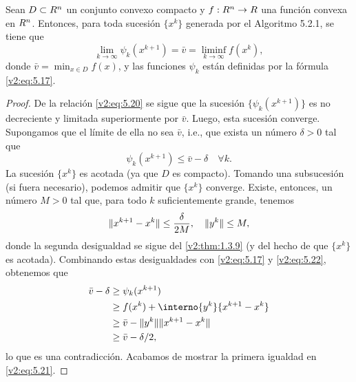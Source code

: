 \begin{theorem}\label{v2:thm:5.2.1}
    Sean $D \subset R^n$ un conjunto convexo compacto y $f : R^n \to R$ una función convexa en $R^n$. 
    Entonces, para toda sucesión $\{x^k\}$ generada por el Algoritmo 5.2.1, se tiene que
    \begin{equation}
        \lim_{k \to \infty} \psi_k(x^{k+1}) = \bar{v} = \liminf_{k \to \infty} f(x^k),
        \label{v2:eq:5.21}
    \end{equation}
    donde $\bar{v} = \min_{x \in D} f(x)$, y las funciones $\psi_k$ están definidas por la fórmula \eqref{v2:eq:5.17}.
\end{theorem}

\begin{proof}
    De la relación \eqref{v2:eq:5.20} se sigue que la sucesión $\{\psi_k(x^{k+1})\}$ es no decreciente y limitada superiormente por $\bar{v}$. Luego, esta sucesión converge. Supongamos que el límite de ella no sea $\bar{v}$, i.e., que exista un número $\delta > 0$ tal que
    \begin{equation}
        \psi_k(x^{k+1}) \le \bar{v} - \delta \quad \forall k.
        \label{v2:eq:5.22}
    \end{equation}
    La sucesión $\{x^k\}$ es acotada (ya que $D$ es compacto). Tomando una subsucesión (si fuera necesario), podemos admitir que $\{x^k\}$ converge. Existe, entonces, un número $M > 0$ tal que, para todo $k$ suficientemente grande, tenemos
    \[
        \lVert x^{k+1} - x^k\rVert \le \frac{\delta}{2M}, \quad \lVert y^k\rVert \le M,
    \]
    donde la segunda desigualdad se sigue del \cref{v2:thm:1.3.9} (y del hecho de que $\{x^k\}$ es acotada). Combinando estas desigualdades con \eqref{v2:eq:5.17} y \eqref{v2:eq:5.22}, obtenemos que
    \begin{align*}
        \bar{v} - \delta &\ge \psi_k(x^{k+1}) \\
        &\ge f(x^k) + \interno{y^k}{x^{k+1} - x^k} \\
        &\ge \bar{v} - \norm{y^k} \norm{x^{k+1} - x^k} \\
        &\ge \bar{v} - \delta/2,
    \end{align*}
    lo que es una contradicción. Acabamos de mostrar la primera igualdad en \eqref{v2:eq:5.21}.
    

\end{proof}
